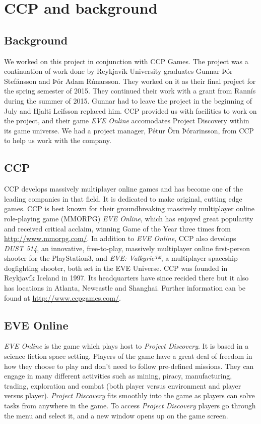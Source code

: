\section{CCP and background}\label{sec:ccp}

\subsection{Background}

We worked on this project in conjunction with CCP Games. The project was a continuation of work done by Reykjavík University graduates Gunnar Þór Stefánsson and Þór Adam Rúnarsson. They worked on it as their final project for the spring semester of 2015. They continued their work with a grant from Rannís during the summer of 2015. Gunnar had to leave the project in the beginning of July and Hjalti Leifsson replaced him. CCP provided us with facilities to work on the project, and their game \emph{EVE Online} accomodates Project Discovery within its game universe. We had a project manager, Pétur Örn Þórarinsson, from CCP to help us work with the company. 

\subsection{CCP}

CCP develops massively multiplayer online games and has become one of the leading companies in that field. It is dedicated to make original, cutting edge games. CCP is best known for their groundbreaking massively multiplayer online role-playing game (MMORPG) \emph{EVE Online}, which has enjoyed great popularity and received critical acclaim, winning Game of the Year three times from \url{http://www.mmorpg.com/}. In addition to \emph{EVE Online}, CCP also develops \emph{DUST 514\textsuperscript{\textregistered}}, an innovative, free-to-play, massively multiplayer online first-person shooter for the PlayStation\textsuperscript{\textregistered}3, and \emph{EVE: Valkyrie™}, a multiplayer spaceship dogfighting shooter, both set in the EVE Universe. CCP was founded in Reykjavík Iceland in 1997. Its headquarters have since recided there but it also has locations in Atlanta, Newcastle and Shanghai. Further information can be found at \url{http://www.ccpgames.com/}.

\subsection{EVE Online}
\emph{EVE Online} is the game which plays host to \emph{Project Discovery}. It is based in a science fiction space setting. Players of the game have a great deal of freedom in how they choose to play and don't need to follow pre-defined missions. They can engage in many different activities such as mining, piracy, manufacturing, trading, exploration and combat (both player versus environment and player versus player). \emph{Project Discovery} fits smoothly into the game as players can solve tasks from anywhere in the game. To access \emph{Project Discovery} players go through the menu and select it, and a new window opens up on the game screen.